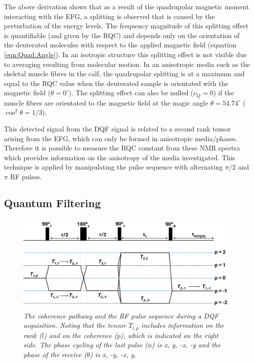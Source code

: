 The above derivation shows that as a result of the quadrupolar magnetic moment interacting with the \ac{EFG}, a splitting is observed that is caused by the perturbation of the energy levels. The frequency magnitude of this splitting effect is quantifiable (and given by the \ac{RQC}) and depends only on the orientation of the deuterated  molecules with respect to the applied magnetic field (equation \ref{eqn:Quad:Angle}). In an isotropic structure this splitting effect is not visible due to averaging resulting from molecular motion. In an anisotropic media such as the skeletal muscle fibres in the calf, the quadrupolar splitting is at a maximum and equal to the \ac{RQC} value when the deuterated sample is orientated with the magnetic field ($\theta = 0^\circ$). The splitting effect can also be nulled ($\nu_Q = 0$) if the muscle fibres are orientated to the magnetic field at the magic angle $\theta = 54.74^\circ$ ($\cos^2\theta=1/3$).

This detected signal from the \ac{DQF} signal is related to a second rank tensor arising from the \ac{EFG}, which can only be formed in anisotropic media/phases. Therefore it is possible to measure the \ac{RQC} constant from these NMR spectra which provides information on the anisotropy of the media investigated. This technique is applied by manipulating the pulse sequence with alternating $\pi/2$ and $\pi$ RF pulses. 

\subsection{Quantum Filtering}

\begin{figure}
    \centering
    \includegraphics[width=1\textwidth]{Figures/Quad/DQF_Coherence.png}
    \caption{\textit{The coherence pathway and the RF pulse sequence during a \ac{DQF} acquisition. Noting that the tensor $T_{l,p}$ includes information on the rank ($l$) and on the coherence ($p$), which is indicated on the right side. The phase cycling of the last pulse ($\phi$) is x, y, -x, -y and the phase of the receive ($\theta$) is x, -y, -x, y.}}
    \label{fig:Quad:Coherence}
\end{figure}

